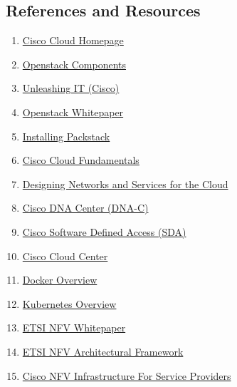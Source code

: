 \subsection{References and Resources}
\begin{enumerate}
  \item \href{http://www.cisco.com/go/cloud}{Cisco Cloud Homepage}
  \item \href{https://en.wikipedia.org/wiki/OpenStack#Components}{Openstack Components}
  \item \href{http://www.unleashingit.com/}{Unleashing IT (Cisco)}
  \item \href{http://getcloudify.org/2014/07/18/openstack-wiki-open-cloud.html}{Openstack Whitepaper}
  \item \href{http://rdoproject.org/install/packstack/}{Installing Packstack}
  \item \href{https://learningnetworkstore.cisco.com/store-search?searchPhrase=CLDFND}{Cisco Cloud Fundamentals}
  \item \href{http://www.ciscopress.com/store/designing-networks-and-services-for-the-cloud-delivering-9781587142949}{Designing Networks and Services for the Cloud}
  \item \href{https://www.cisco.com/c/en/us/products/collateral/cloud-systems-management/dna-center/nb-09-dna-center-data-sheet-cte-en.html}{Cisco DNA Center (DNA-C)}
  \item \href{https://www.cisco.com/c/dam/en/us/solutions/collateral/enterprise-networks/software-defined-access/solution-overview-c22-739012.pdf?oid=sowen000311}{Cisco Software Defined Access (SDA)}
  \item \href{https://www.cisco.com/c/dam/en/us/products/collateral/cloud-systems-management/cloudcenter/white-paper-c11-737224.pdf}{Cisco Cloud Center}
  \item \href{https://www.docker.com/what-docker}{Docker Overview}
  \item \href{https://kubernetes.io/docs/tutorials/kubernetes-basics/}{Kubernetes Overview}
  \item \href{https://portal.etsi.org/Portals/0/TBpages/NFV/Docs/NFV_White_Paper3.pdf}{ETSI NFV Whitepaper}
  \item \href{http://www.etsi.org/deliver/etsi_gs/nfv/001_099/002/01.01.01_60/gs_nfv002v010101p.pdf}{ETSI NFV Architectural Framework}
  \item \href{https://www.cisco.com/c/dam/en/us/solutions/collateral/service-provider/network-functions-virtualization-nfv-infrastructure/pa-cisco-nfv-infrastructure-solution-brief.pdf}{Cisco NFV Infrastructure For Service Providers}

\end{enumerate}
